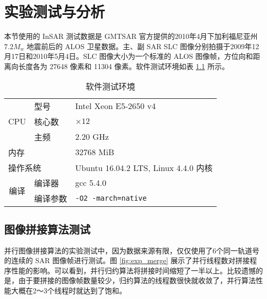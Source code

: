 \chapter{实验测试与分析}

本节使用的 InSAR 测试数据是 GMTSAR 官方提供的2010年4月下加利福尼亚州 $7.2 M_w$ 地震前后的 ALOS 卫星数据。主、副 SAR SLC 图像分别拍摄于2009年12月17日和2010年5月4日。SLC 图像大小为一个标准的 ALOS 图像帧，方位向和距离向长度各为 27648 像素和 11304 像素。软件测试环境如表 \ref{tab:env} 所示。

\begin{table}[htbp]
\centering
\begin{tabular}{|l|l|l|}
\hline
    \multirow{3}{*}{CPU}                        & 型号     & Intel Xeon E5-2650 v4                 \\ \cline{2-3} 
                                                & 核心数   & $\times 12$                           \\ \cline{2-3} 
                                                & 主频     & 2.20 GHz                              \\ \hline
    \multicolumn{2}{|l|}{内存}                             & 32768 MiB                             \\ \hline
    \multicolumn{2}{|l|}{操作系统}                         & Ubuntu 16.04.2 LTS, Linux 4.4.0 内核  \\ \hline
    \multicolumn{1}{|c|}{\multirow{2}{*}{编译}} & 编译器   & gcc 5.4.0                             \\ \cline{2-3} 
    \multicolumn{1}{|c|}{}                      & 编译参数 & \texttt{-O2 -march=native}            \\ \hline
\end{tabular}
\caption{软件测试环境} \label{tab:env}
\end{table}

\section{图像拼接算法测试}

并行图像拼接算法的实验测试中，因为数据来源有限，仅仅使用了6个同一轨道号的连续的 SAR 图像帧进行测试。图 \ref{fig:exp_merge} 展示了并行线程数对拼接程序性能的影响。可以看到，并行归约算法将拼接时间缩短了一半以上。比较遗憾的是，由于要拼接的图像帧数量较少，归约算法的线程数很快就收敛了，并行算法性能大概在2～3个线程时就达到了饱和。

